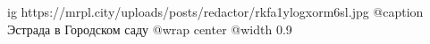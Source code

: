  
 
 
 
 

\ifcmt
  ig https://mrpl.city/uploads/posts/redactor/rkfa1ylogxorm6sl.jpg
	@caption Эстрада в Городском саду
  @wrap center
  @width 0.9
\fi
